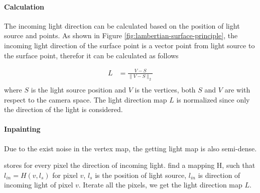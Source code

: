 \documentclass[]{article}
\begin{document}
\paragraph{Calculation}
The incoming light direction can be calculated based on the position of light source and points. As shown in Figure \ref{fig:lambertian-surface-principle}, the incoming light direction of the surface point is a vector point from light source to the surface point, therefor it can be calculated as follows

\begin{equation}\label{light-direction}
	\begin{array}{ll}
		L&= \frac{V-S}{\|V-S\|_2}\\ 
	\end{array}
\end{equation}
where $ S $ is the light source position and $ V $ is the vertices, both $ S $ and  $ V $ are with respect to the camera space. The light direction map $ L $ is normalized since only the direction of the light is considered. 

\paragraph{Inpainting}
Due to the exist noise in the vertex map, the getting light map is also semi-dense.

stores for every pixel the direction of incoming light.
find a mapping H, such that $ l_{in} = H(v, l_{s}) $ for pixel $ v $, $ l_s $ is the position of light source, $ l_{in} $ is direction of incoming light of pixel $ v $. Iterate all the pixels, we get the light direction map $ L $.
\end{document}
